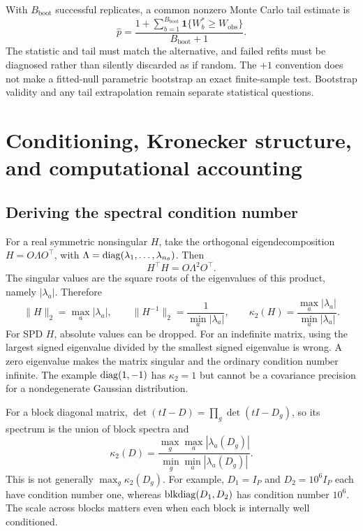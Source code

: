 With $B_{\mathrm{boot}}$ successful replicates, a common nonzero
Monte Carlo tail estimate is
\[
 \widehat p=
 \frac{1+\sum_{b=1}^{B_{\mathrm{boot}}}
                     \mathbf1\{W_b^*\geq W_{\mathrm{obs}}\}}
      {B_{\mathrm{boot}}+1}.
\]
The statistic and tail must match the alternative, and failed refits
must be diagnosed rather than silently discarded as if random.
The $+1$ convention does not make a fitted-null parametric bootstrap
an exact finite-sample test.  Bootstrap validity and any tail
extrapolation remain separate statistical questions.

\section{Conditioning, Kronecker structure, and computational accounting}
\label{cov-computation}

\subsection{Deriving the spectral condition number}
\label{cov-condition}

For a real symmetric nonsingular $H$, take the orthogonal
eigendecomposition $H=O\Lambda O^\top$, with
$\Lambda=\operatorname{diag}(\lambda_1,\ldots,\lambda_{n_\theta})$.
Then
\[
 H^\top H=O\Lambda^2O^\top .
\]
The singular values are the square roots of the eigenvalues of this
product, namely $|\lambda_a|$.  Therefore
\begin{equation}
 \|H\|_2=\max_a|\lambda_a|,\qquad
 \|H^{-1}\|_2=\frac1{\min_a|\lambda_a|},\qquad
 \kappa_2(H)=\frac{\max_a|\lambda_a|}{\min_a|\lambda_a|}.
 \label{cov-spectral-condition}
\end{equation}
For SPD $H$, absolute values can be dropped.  For an indefinite matrix,
using the largest signed eigenvalue divided by the smallest signed
eigenvalue is wrong.  A zero eigenvalue makes the matrix singular and
the ordinary condition number infinite.  The example
$\operatorname{diag}(1,-1)$ has $\kappa_2=1$ but cannot be a covariance precision
for a nondegenerate Gaussian distribution.

For a block diagonal matrix,
$\det(tI-D)=\prod_g\det(tI-D_g)$, so its spectrum is the union of
block spectra and
\[
 \kappa_2(D)=
 \frac{\max_g\max_a|\lambda_a(D_g)|}
      {\min_g\min_a|\lambda_a(D_g)|}.
\]
This is not generally $\max_g\kappa_2(D_g)$.  For example,
$D_1=I_P$ and $D_2=10^6I_P$ each have condition number one,
whereas $\operatorname{blkdiag}(D_1,D_2)$ has condition number $10^6$.
The scale across blocks matters even when each block is internally
well conditioned.

